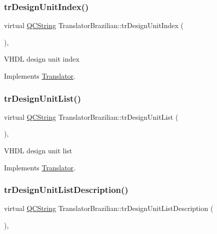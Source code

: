 \subsubsection{\texorpdfstring{trDesignUnitIndex()}{trDesignUnitIndex()}}
{\footnotesize\ttfamily virtual \mbox{\hyperlink{class_q_c_string}{Q\+C\+String}} Translator\+Brazilian\+::tr\+Design\+Unit\+Index (\begin{DoxyParamCaption}{ }\end{DoxyParamCaption})\hspace{0.3cm}{\ttfamily [inline]}, {\ttfamily [virtual]}}

V\+H\+DL design unit index 

Implements \mbox{\hyperlink{class_translator}{Translator}}.

\mbox{\label{class_translator_brazilian_abf24e66004716ddc77f72906ed9a0cc9}} 
\subsubsection{\texorpdfstring{trDesignUnitList()}{trDesignUnitList()}}
{\footnotesize\ttfamily virtual \mbox{\hyperlink{class_q_c_string}{Q\+C\+String}} Translator\+Brazilian\+::tr\+Design\+Unit\+List (\begin{DoxyParamCaption}{ }\end{DoxyParamCaption})\hspace{0.3cm}{\ttfamily [inline]}, {\ttfamily [virtual]}}

V\+H\+DL design unit list 

Implements \mbox{\hyperlink{class_translator}{Translator}}.

\mbox{\label{class_translator_brazilian_aa790d2672648700af93604e5b8d4779d}} 
\subsubsection{\texorpdfstring{trDesignUnitListDescription()}{trDesignUnitListDescription()}}
{\footnotesize\ttfamily virtual \mbox{\hyperlink{class_q_c_string}{Q\+C\+String}} Translator\+Brazilian\+::tr\+Design\+Unit\+List\+Description (\begin{DoxyParamCaption}{ }\end{DoxyParamCaption})\hspace{0.3cm}{\ttfamily [inline]}, {\ttfamily [virtual]}}

